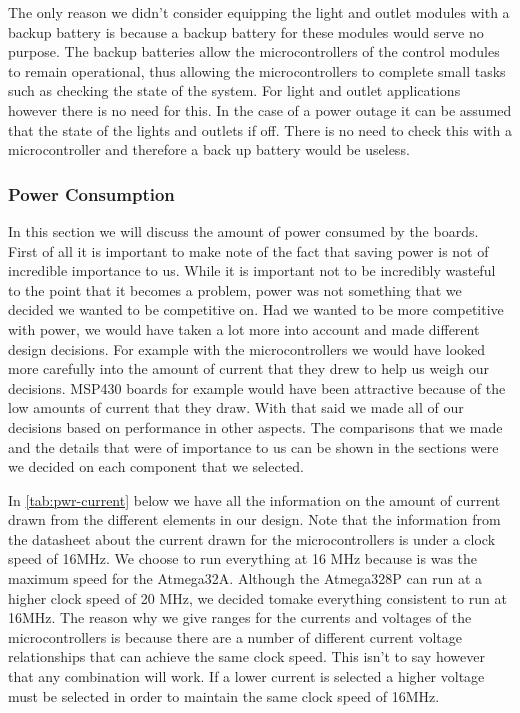 
The only reason we didn't consider equipping the light and outlet modules with a backup battery is because a backup battery for these modules
would serve no purpose. The backup batteries allow the microcontrollers of
the control modules to remain operational, thus allowing the microcontrollers
to complete small tasks such as checking the state of the system. For light
and outlet applications however there is no need for this. In the case of a
power outage it can be assumed that the state of the lights and outlets if
off. There is no need to check this with a microcontroller and therefore a back
up battery would be useless.

\subsubsection{Power Consumption}
\label{sec:power-consumption}
In this section we will discuss the amount of power consumed by the boards.
First of all it is important to make note of the fact that saving power is not
of incredible importance to us. While it is important not to be incredibly
wasteful to the point that it becomes a problem, power was not something that
we decided we wanted to be competitive on. Had we wanted to be more competitive
with power, we would have taken a lot more into account and made different
design decisions. For example with the microcontrollers we would have looked
more carefully into the amount of current that they drew to help us weigh our
decisions. MSP430 boards for example would have been attractive because of the
low amounts of current that they draw. With that said we made all of our
decisions based on performance in other aspects.  The comparisons that we made
and the details that were of importance to us can be shown in the sections were
we decided on each component that we selected.

In \autoref{tab:pwr-current} below we have all the information on the amount of
current drawn from the different elements in our design. Note
that the information from the datasheet about the current drawn for the
microcontrollers is under a clock speed of 16MHz. We choose to run everything
at 16 MHz because is was the maximum speed for the Atmega32A. Although the
Atmega328P can run at a higher clock speed of 20 MHz, we decided tomake
everything consistent to run at 16MHz. The reason why we give ranges for the
currents and voltages of the microcontrollers is because there are a number of
different current voltage relationships that can achieve the same clock speed.
This isn{}'t to say however that any combination will work. If a lower current
is selected a higher voltage must be selected in order to maintain the same
clock speed of 16MHz.

